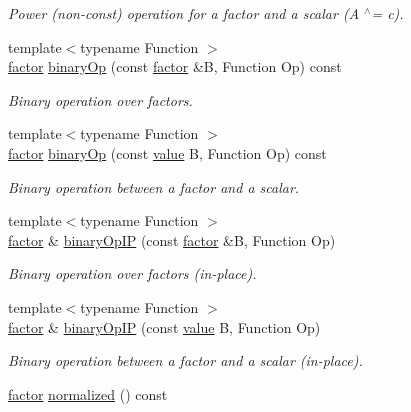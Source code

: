 \begin{DoxyCompactItemize}
\begin{DoxyCompactList}\small\item\em Power (non-\/const) operation for a factor and a scalar (A $^\wedge$= c). \end{DoxyCompactList}\item 
{\footnotesize template$<$typename Function $>$ }\\\hyperlink{classmerlin_1_1factor}{factor} \hyperlink{classmerlin_1_1factor_a563d7aa46cad4410f5aed58c5bb88059}{binary\+Op} (const \hyperlink{classmerlin_1_1factor}{factor} \&B, Function Op) const 
\begin{DoxyCompactList}\small\item\em Binary operation over factors. \end{DoxyCompactList}\item 
{\footnotesize template$<$typename Function $>$ }\\\hyperlink{classmerlin_1_1factor}{factor} \hyperlink{classmerlin_1_1factor_a17e9043b5448fe202165731def4c02d2}{binary\+Op} (const \hyperlink{classmerlin_1_1factor_a1b14d19e509403448fbef26b003c9281}{value} B, Function Op) const 
\begin{DoxyCompactList}\small\item\em Binary operation between a factor and a scalar. \end{DoxyCompactList}\item 
{\footnotesize template$<$typename Function $>$ }\\\hyperlink{classmerlin_1_1factor}{factor} \& \hyperlink{classmerlin_1_1factor_a6c7713d1ba56aab3a262a78253b7e0c1}{binary\+Op\+IP} (const \hyperlink{classmerlin_1_1factor}{factor} \&B, Function Op)
\begin{DoxyCompactList}\small\item\em Binary operation over factors (in-\/place). \end{DoxyCompactList}\item 
{\footnotesize template$<$typename Function $>$ }\\\hyperlink{classmerlin_1_1factor}{factor} \& \hyperlink{classmerlin_1_1factor_abde03139bbbfeeee2bb3456208243fa5}{binary\+Op\+IP} (const \hyperlink{classmerlin_1_1factor_a1b14d19e509403448fbef26b003c9281}{value} B, Function Op)
\begin{DoxyCompactList}\small\item\em Binary operation between a factor and a scalar (in-\/place). \end{DoxyCompactList}\item 
\hyperlink{classmerlin_1_1factor}{factor} \hyperlink{classmerlin_1_1factor_a7b01ffd47db2ae23a335cfa35aa8d009}{normalized} () const 

\end{DoxyCompactItemize}

